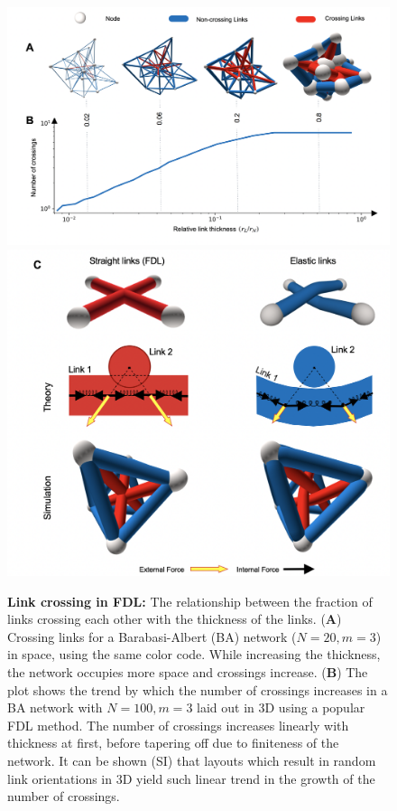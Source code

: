 \documentclass[nofootinbib,preprint,floatfix,titlepage,endfloats]{revtex4} %
\begin{document}
\begin{figure}
    \vspace{15cm}
\end{figure}
\begin{figure}
    \centering
    \includegraphics[width=.6\columnwidth]{fig-09-19/panel-crs-3.png}
    \includegraphics[width = .6\columnwidth]{fig-09-19/elf-resolve.png}
    \caption{%
    {\scriptsize {\bf Link crossing in FDL:} The relationship between the fraction of links crossing each other with the thickness of the links. 
    ({\bf A})  Crossing links for a Barabasi-Albert (BA) network ($N = 20, m = 3$) in space, using the same color code. While increasing the thickness, the network occupies more space and crossings increase. 
    ({\bf B}) The plot shows the trend by which the number of crossings increases in a BA network with $N=100, m =3$ laid out in 3D using a popular FDL method.
    The number of crossings increases linearly with thickness at first, before tapering off due to finiteness of the network. It can be shown (SI) that layouts which result in random link orientations in 3D yield such linear trend in the growth of the number of crossings.
}}
\end{figure}
\end{document}
